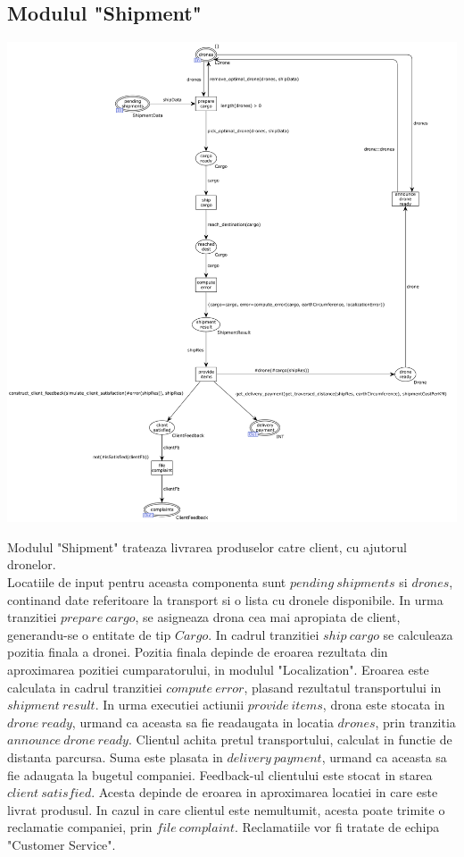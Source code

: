 \begin{spacing}{1.5}
\section{Modulul "Shipment"}

\includegraphics[width=\textwidth]{./Parts/Chapter1/Shipment.png}

Modulul "Shipment" trateaza livrarea produselor catre client, cu ajutorul dronelor.\\
Locatiile de input pentru aceasta componenta sunt $pending\ shipments$ si $drones$, continand date
referitoare la transport si o lista cu dronele disponibile. In urma tranzitiei $prepare\ cargo$, se asigneaza
drona cea mai apropiata de client, generandu-se o entitate de tip $Cargo$. In cadrul tranzitiei $ship\ cargo$
se calculeaza pozitia finala a dronei. Pozitia finala depinde de eroarea rezultata din aproximarea pozitiei
cumparatorului, in modulul "Localization". Eroarea este calculata in cadrul tranzitiei $compute\ error$,
plasand rezultatul transportului in $shipment\ result$. In urma executiei actiunii $provide\ items$, drona
este stocata in $drone\ ready$, urmand ca aceasta sa fie readaugata in locatia $drones$, prin tranzitia
$announce\ drone\ ready$. Clientul achita pretul transportului, calculat in functie de distanta parcursa.
Suma este plasata in $delivery\ payment$, urmand ca aceasta sa fie adaugata la bugetul companiei.
Feedback-ul clientului este stocat in starea $client\ satisfied$. Acesta depinde de eroarea in aproximarea
locatiei in care este livrat produsul. In cazul in care clientul este nemultumit, acesta poate trimite
o reclamatie companiei, prin $file\ complaint$. Reclamatiile vor fi tratate de echipa "Customer Service".


\end{spacing}
